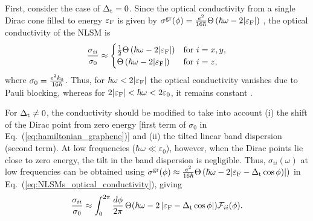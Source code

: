 \documentclass[aps,twocolumn,floatfix]{revtex4-1}
\begin{document}
First, consider the case of $\Delta_{\rm t}=0$. Since the optical conductivity from a single Dirac cone filled to energy $\varepsilon_{\rm F}$ is given by $\sigma^{\rm gr}(\phi)=\frac{e^2}{16\hbar}\Theta\left(\hbar\omega-2|\varepsilon_{\rm F}|\right)$ \cite{Ando2002}, the optical conductivity of the NLSM is
\begin{equation}
\label{eq:NLSMs_graphene_optical_conductivity}
{\sigma_{ii} \over \sigma_0}\approx
\begin{cases}
\frac{1}{2}\Theta\left(\hbar\omega-2|\varepsilon_{\rm F}|\right) &\text{for $i=x,y$},\\
\Theta\left(\hbar\omega-2|\varepsilon_{\rm F}|\right) &\text{for $i=z$},
\end{cases}
\end{equation}
where $\sigma_0={e^2 k_0 \over 16\hbar}$.
Thus, for $\hbar\omega<2|\varepsilon_{\rm F}|$ the optical conductivity vanishes due to Pauli blocking, whereas for $2|\varepsilon_{\rm F}|<\hbar\omega<2\varepsilon_0$, it remains constant \cite{Carbotte2017}.

For $\Delta_{\rm t}\neq0$, the conductivity should be modified to take into account (i) the shift of the Dirac point from zero energy [first term of $\sigma_0$ in Eq.~(\ref{eq:hamiltonian_graphene})] and (ii) the tilted linear band dispersion (second term). At low frequencies ($\hbar\omega\ll \varepsilon_0$), however, when the Dirac points lie close to zero energy, the tilt in the band dispersion is negligible. Thus, $\sigma_{ii}(\omega)$ at low frequencies can be obtained using $\sigma^{\rm gr}(\phi)\approx\frac{e^2}{16\hbar}\Theta\left(\hbar\omega-2|\varepsilon_{\rm F}-\Delta_{\rm t}\cos\phi)|\right)$ in Eq.~(\ref{eq:NLSMs_optical_conductivity}), giving
\begin{equation}
\label{eq:NLSMs_optical_conductivity_normalized}
{\sigma_{ii} \over \sigma_0}
\approx\int_{0}^{2\pi} {d\phi\over 2\pi}\,
\Theta({\hbar\omega-2\left|\varepsilon_{\rm F}-\Delta_{\rm t}\cos{\phi}\right|}) {\mathcal F}_{ii}(\phi).
\end{equation}
\end{document}
